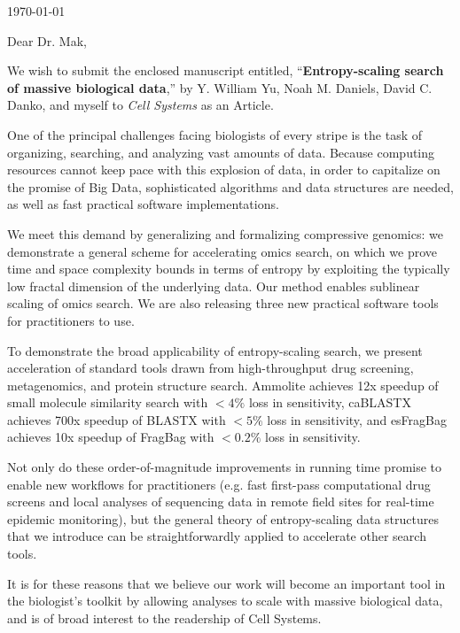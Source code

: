 \documentclass{article}
\begin{document}
\hspace*{0.5\linewidth}

\today

\bigskip

Dear Dr. Mak,

We wish to submit the enclosed manuscript entitled,
``\textbf{Entropy-scaling search of massive biological data},''
by Y. William Yu, Noah M. Daniels, David C. Danko, and myself
to \textit{Cell Systems} as an Article.

One of the principal challenges facing biologists of every stripe is the task 
of organizing, searching, and analyzing vast amounts of data.
Because computing resources cannot keep pace with this explosion of data, in order to capitalize on the promise of Big Data, sophisticated algorithms and data structures are needed, as well as fast practical software implementations.

We meet this demand by generalizing and formalizing compressive 
genomics: we demonstrate a general scheme for accelerating omics search, on which we prove time and space complexity bounds in terms 
of entropy by exploiting the typically low fractal dimension of the underlying 
data. 
Our method enables sublinear scaling of omics search.
We are also releasing three new practical software tools for practitioners to use.
 
To demonstrate the broad applicability of entropy-scaling search, we present acceleration of standard tools drawn from high-throughput drug screening, metagenomics, and protein structure search.
Ammolite achieves 12x speedup of small molecule similarity search with $<4\%$ loss in sensitivity,
caBLASTX achieves 700x speedup of BLASTX with $<5\%$ loss in sensitivity,  and esFragBag achieves 10x speedup of FragBag with $<0.2\%$ loss in sensitivity.

Not only do these order-of-magnitude improvements in running time promise to enable new workflows for practitioners (e.g. fast first-pass computational drug screens and local analyses of sequencing data in remote field sites for real-time epidemic 
monitoring), but the general theory of entropy-scaling data structures that we introduce can be straightforwardly applied to accelerate other search tools.

It is for these reasons that we believe our work will become an important tool in the biologist's toolkit by allowing analyses to scale with massive biological data, and is of broad interest to the readership of Cell Systems.
\end{document}
